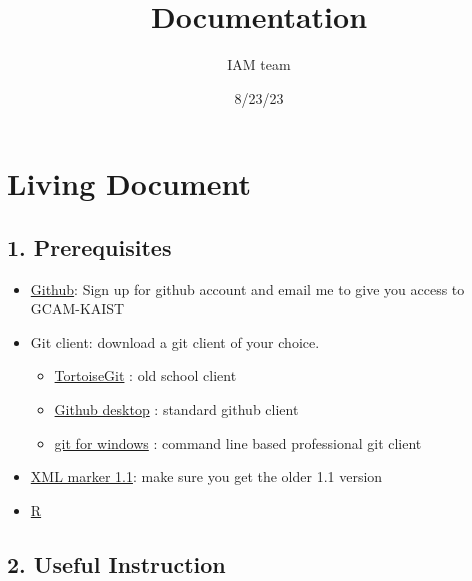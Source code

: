 \documentclass[
  letterpaper,
  DIV=11,
  numbers=noendperiod]{scrartcl}
\title{Documentation}
\author{IAM team}
\date{8/23/23}
\providecommand{\tightlist}{%
  \setlength{\itemsep}{0pt}\setlength{\parskip}{0pt}}\usepackage{longtable,booktabs,array}
\begin{document}
\maketitle
\ifdefined\Shaded\renewenvironment{Shaded}{\begin{tcolorbox}[frame hidden, boxrule=0pt, borderline west={3pt}{0pt}{shadecolor}, breakable, enhanced, sharp corners, interior hidden]}{\end{tcolorbox}}\fi

\hypertarget{living-document}{%
\section{Living Document}\label{living-document}}

\hypertarget{prerequisites}{%
\subsection{1. Prerequisites}\label{prerequisites}}

\begin{itemize}
\tightlist
\item
  \href{https://github.com/GCAM-KAIST/gcam-core}{Github}: Sign up for
  github account and email me to give you access to GCAM-KAIST
\item
  Git client: download a git client of your choice.

  \begin{itemize}
  \tightlist
  \item
    \href{https://tortoisegit.org/}{TortoiseGit} : old school client
  \item
    \href{https://desktop.github.com/}{Github desktop} : standard github
    client
  \item
    \href{https://gitforwindows.org/}{git for windows} : command line
    based professional git client
  \end{itemize}
\item
  \href{https://symbolclick.com/xmlmarker_1_1_setup.exe}{XML marker
  1.1}: make sure you get the older 1.1 version
\item
  \href{https://posit.co/download/rstudio-desktop/}{R}
\end{itemize}

\hypertarget{useful-instruction}{%
\subsection{2. Useful Instruction}\label{useful-instruction}}
\end{document}
